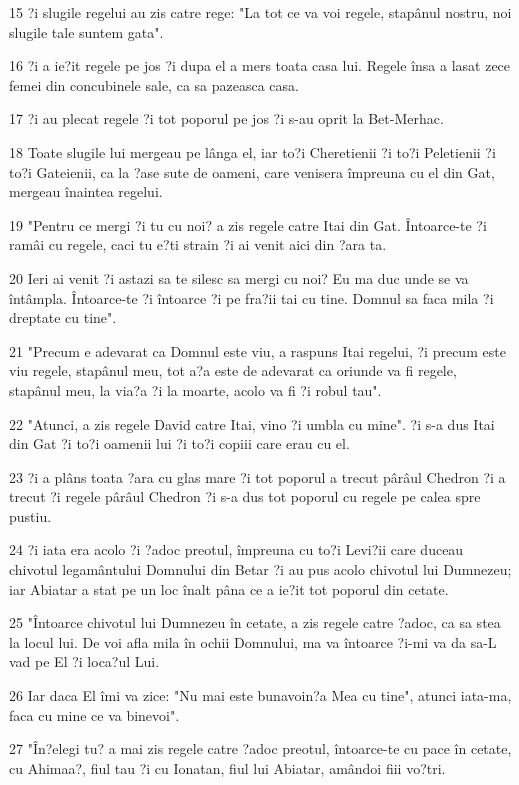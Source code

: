 \par 15 ?i slugile regelui au zis catre rege: "La tot ce va voi regele, stapânul nostru, noi slugile tale suntem gata".
\par 16 ?i a ie?it regele pe jos ?i dupa el a mers toata casa lui. Regele însa a lasat zece femei din concubinele sale, ca sa pazeasca casa.
\par 17 ?i au plecat regele ?i tot poporul pe jos ?i s-au oprit la Bet-Merhac.
\par 18 Toate slugile lui mergeau pe lânga el, iar to?i Cheretienii ?i to?i Peletienii ?i to?i Gateienii, ca la ?ase sute de oameni, care venisera împreuna cu el din Gat, mergeau înaintea regelui.
\par 19 "Pentru ce mergi ?i tu cu noi? a zis regele catre Itai din Gat. Întoarce-te ?i ramâi cu regele, caci tu e?ti strain ?i ai venit aici din ?ara ta.
\par 20 Ieri ai venit ?i astazi sa te silesc sa mergi cu noi? Eu ma duc unde se va întâmpla. Întoarce-te ?i întoarce ?i pe fra?ii tai cu tine. Domnul sa faca mila ?i dreptate cu tine".
\par 21 "Precum e adevarat ca Domnul este viu, a raspuns Itai regelui, ?i precum este viu regele, stapânul meu, tot a?a este de adevarat ca oriunde va fi regele, stapânul meu, la via?a ?i la moarte, acolo va fi ?i robul tau".
\par 22 "Atunci, a zis regele David catre Itai, vino ?i umbla cu mine". ?i s-a dus Itai din Gat ?i to?i oamenii lui ?i to?i copiii care erau cu el.
\par 23 ?i a plâns toata ?ara cu glas mare ?i tot poporul a trecut pârâul Chedron ?i a trecut ?i regele pârâul Chedron ?i s-a dus tot poporul cu regele pe calea spre pustiu.
\par 24 ?i iata era acolo ?i ?adoc preotul, împreuna cu to?i Levi?ii care duceau chivotul legamântului Domnului din Betar ?i au pus acolo chivotul lui Dumnezeu; iar Abiatar a stat pe un loc înalt pâna ce a ie?it tot poporul din cetate.
\par 25 "Întoarce chivotul lui Dumnezeu în cetate, a zis regele catre ?adoc, ca sa stea la locul lui. De voi afla mila în ochii Domnului, ma va întoarce ?i-mi va da sa-L vad pe El ?i loca?ul Lui.
\par 26 Iar daca El îmi va zice: "Nu mai este bunavoin?a Mea cu tine", atunci iata-ma, faca cu mine ce va binevoi".
\par 27 "În?elegi tu? a mai zis regele catre ?adoc preotul, întoarce-te cu pace în cetate, cu Ahimaa?, fiul tau ?i cu Ionatan, fiul lui Abiatar, amândoi fiii vo?tri.
